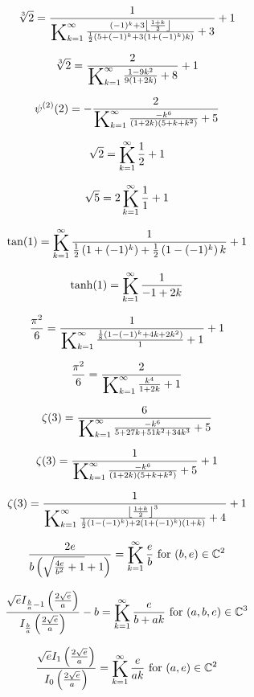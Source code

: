 \documentclass{article}
\newcommand{\bigK}{\mathop{\raisebox{-5pt}{\huge K}}}
\begin{document}
\[\sqrt[3]{2}=\frac{1}{\bigK_{k=1}^{\infty}\frac{(-1)^k+3 \left\lfloor \frac{1+k}{2}\right\rfloor }{\frac{1}{2} \left(5+(-1)^k+3 \left(1+(-1)^k\right) k\right)}+3}+1\] 

\[\sqrt[3]{2}=\frac{2}{\bigK_{k=1}^{\infty}\frac{1-9 k^2}{9 (1+2 k)}+8}+1\] 

\[\psi ^{(2)}(2)=-\frac{2}{\bigK_{k=1}^{\infty}\frac{-k^6}{(1+2 k) \left(5+k+k^2\right)}+5}\] 

\[\sqrt{2}=\bigK_{k=1}^{\infty}\frac{1}{2}+1\] 

\[\sqrt{5}=2 \bigK_{k=1}^{\infty}\frac{1}{1}+1\] 

\[\tan (1)=\bigK_{k=1}^{\infty}\frac{1}{\frac{1}{2} \left(1+(-1)^k\right)+\frac{1}{2} \left(1-(-1)^k\right) k}+1\] 

\[\tanh (1)=\bigK_{k=1}^{\infty}\frac{1}{-1+2 k}\] 

\[\frac{\pi ^2}{6}=\frac{1}{\bigK_{k=1}^{\infty}\frac{\frac{1}{8} \left(1-(-1)^k+4 k+2 k^2\right)}{1}+1}+1\] 

\[\frac{\pi ^2}{6}=\frac{2}{\bigK_{k=1}^{\infty}\frac{k^4}{1+2 k}+1}\] 

\[\zeta (3)=\frac{6}{\bigK_{k=1}^{\infty}\frac{-k^6}{5+27 k+51 k^2+34 k^3}+5}\] 

\[\zeta (3)=\frac{1}{\bigK_{k=1}^{\infty}\frac{-k^6}{(1+2 k) \left(5+k+k^2\right)}+5}+1\] 

\[\zeta (3)=\frac{1}{\bigK_{k=1}^{\infty}\frac{\left\lfloor \frac{1+k}{2}\right\rfloor ^3}{\frac{1}{2} \left(1-(-1)^k\right)+2 \left(1+(-1)^k\right) (1+k)}+4}+1\] 

\[\frac{2 e}{b \left(\sqrt{\frac{4 e}{b^2}+1}+1\right)}=\bigK_{k=1}^{\infty}\frac{e}{b}\text{ for }(b,e)\in \mathbb{C}^2\] 

\[\frac{\sqrt{e} I_{\frac{b}{a}-1}\left(\frac{2 \sqrt{e}}{a}\right)}{I_{\frac{b}{a}}\left(\frac{2 \sqrt{e}}{a}\right)}-b=\bigK_{k=1}^{\infty}\frac{e}{b+a k}\text{ for }(a,b,e)\in \mathbb{C}^3\] 

\[\frac{\sqrt{e} I_1\left(\frac{2 \sqrt{e}}{a}\right)}{I_0\left(\frac{2 \sqrt{e}}{a}\right)}=\bigK_{k=1}^{\infty}\frac{e}{a k}\text{ for }(a,e)\in \mathbb{C}^2\] 
\end{document}
